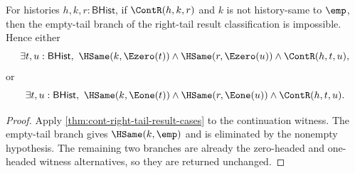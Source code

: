 \begin{lemma}
\label{lem:cont-right-tail-result-nonempty-cases}
For histories $h,k,r:\mathsf{BHist}$, if $\ContR(h,k,r)$ and $k$ is not
history-same to $\emp$, then the empty-tail branch of the right-tail result
classification is impossible. Hence either
$$
\exists t,u:\mathsf{BHist},\
\HSame(k,\Ezero(t))\land\HSame(r,\Ezero(u))\land\ContR(h,t,u),
$$
or
$$
\exists t,u:\mathsf{BHist},\
\HSame(k,\Eone(t))\land\HSame(r,\Eone(u))\land\ContR(h,t,u).
$$
\end{lemma}
\begin{proof}
Apply \autoref{thm:cont-right-tail-result-cases} to the continuation witness.
The empty-tail branch gives $\HSame(k,\emp)$ and is eliminated by the
nonempty hypothesis. The remaining two branches are already the zero-headed
and one-headed witness alternatives, so they are returned unchanged.
\end{proof}
